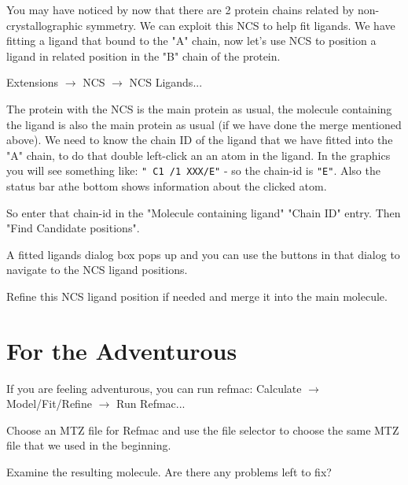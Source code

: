 \documentclass{article}
\begin{document}
 You may have noticed by now that there are 2 protein chains related
 by non-crystallographic symmetry.  We can exploit this NCS to help
 fit ligands.  We have fitting a ligand that bound to the "A" chain,
 now let's use NCS to position a ligand in related position in the "B"
 chain of the protein.

 \textsf{Extensions $\rightarrow$ NCS $\rightarrow$ NCS Ligands...}

 The protein with the NCS is the main protein as usual, the molecule
 containing the ligand is also the main protein as usual (if we have
 done the merge mentioned above).  We need to know the chain ID of the
 ligand that we have fitted into the "A" chain, to do that double
 left-click an an atom in the ligand. In the graphics you will see
 something like: \texttt{" C1 /1 XXX/E"} - so the chain-id is
 \texttt{"E"}. Also the status bar athe bottom shows information about
 the clicked atom.

 So enter that chain-id in the "Molecule containing ligand" "Chain ID"
 entry.  Then \textsf{"Find Candidate positions"}.
 
 A fitted ligands dialog box pops up and you can use the buttons in
 that dialog to navigate to the NCS ligand positions.

 Refine this NCS ligand position if needed and merge it into the main
 molecule.

\section{For the Adventurous}

If you are feeling adventurous, you can run refmac: \textsf{Calculate
  $\rightarrow$ Model/Fit/Refine $\rightarrow$ Run Refmac...}

 Choose an MTZ file for Refmac and use the file selector to choose the
 same MTZ file that we used in the beginning.

 Examine the resulting molecule.  Are there any problems left to fix?
\end{document}
